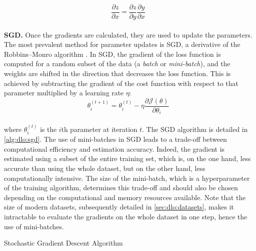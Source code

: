 \begin{equation}
  \label{eqn:dlo:chain_rule}
  \frac{\partial z}{\partial x} = \frac{\partial z}{\partial y} \frac{\partial y}{\partial x}
\end{equation}\\

\noindent \textbf{\acl{SGD}.} Once the gradients are calculated, they are used
to update the parameters. The most prevalent method for parameter updates is
\acf{SGD}, a derivative of the Robbins–Monro algorithm
\cite{robbins1951stochastic}. In \ac{SGD}, the gradient of the loss function is
computed for a random subset of the data (a \emph{batch} or \emph{mini-batch}),
and the weights are shifted in the direction that decreases the loss function.
This is achieved by subtracting the gradient of the cost function with respect
to that parameter multiplied by a learning rate $\eta$:\\

\begin{equation}
\label{eqn:dlo:sgd_update}
\theta_i^{(t+1)} = \theta_i^{(t)} - \eta \frac{\partial \mathcal{J}(\theta)}{\partial \theta_i}
\end{equation}\\

\noindent where $\theta_i^{(t)}$ is the $i$th parameter at iteration $t$. The
\ac{SGD} algorithm is detailed in \cref{alg:dlo:sgd}. The use of mini-batches in
\ac{SGD} leads to a trade-off between computational efficiency and estimation
accuracy. Indeed, the gradient is estimated using a subset of the entire
training set, which is, on the one hand, less accurate than using the whole
dataset, but on the other hand, less computationally intensive. The size of the
mini-batch, which is a hyperparameter of the training algorithm, determines this
trade-off and should also be chosen depending on the computational and memory
resources available. Note that the size of modern datasets, subsequently
detailed in \cref{sec:dlo:datasets}, makes it intractable to evaluate the
gradients on the whole dataset in one step, hence the use of mini-batches.\\

\begin{algorithm}
  \caption{Stochastic Gradient Descent Algorithm}
  \label{alg:dlo:sgd}
  \begin{algorithmic}
      
      \ENDWHILE {}
  \end{algorithmic}
\end{algorithm}


